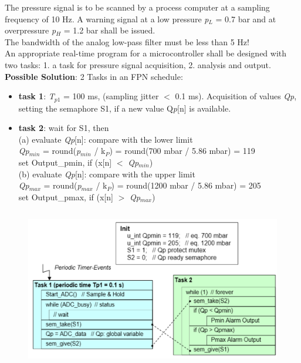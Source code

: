 The pressure signal is to be scanned by a process computer at a sampling frequency of 10 Hz. A warning signal at a low pressure \textit{p}${}_{L}$ = 0.7 bar and at overpressure \textit{p}${}_{H}$ = 1.2 bar shall be issued.\\

The bandwidth of the analog low-pass filter must be less than 5 Hz!\\

An appropriate real-time program for a microcontroller shall be designed with two tasks: 1. a task for pressure signal acquisition, 2. analysis and output.\\

\textbf{Possible Solution}: 2 Tasks in an FPN schedule:

\begin{itemize}
\item \textbf{task 1}:  \textit{T}${}_{p1}$ = 100 ms, (sampling jitter $<$  0.1 ms). Acquisition of values \textit{Qp}, setting the semaphore S1, if a new value Q\textit{p}[n] is available.

\item \textbf{task 2}:  wait for S1, then \\
(a) evaluate \textit{Qp}[n]:  compare with the lower limit\\
\textit{Qp}${}_{min}$ = round(\textit{p}${}_{min}$ / k${}_{P}$) = round(700 mbar / 5.86 mbar) = 119\\
set Output\_pmin, if (x[n] $\mathrm{<}$ \textit{Qp}${}_{min}$)\\

(b) evaluate \textit{Qp}[n]: compare with the upper limit  \\  \textit{Qp}${}_{max}$ = round(\textit{p}${}_{max}$ / k${}_{P}$) = round(1200 mbar / 5.86 mbar) = 205 \\ set Output\_pmax, if (x[n] $\mathrm{>}$ \textit{Qp}${}_{max}$)
\end{itemize}

    \begin{figure}[h]
    \centering
    \includegraphics[width=12cm, height=7cm]{Images/image142.png}
    \label{fig:Fig 94}
    \end{figure}

